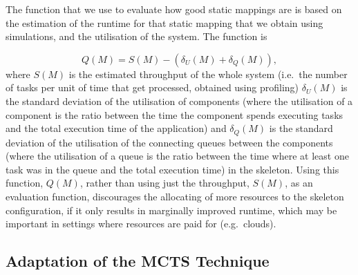 \documentclass[smallextended]{svjour3}
\begin{document}


The function that we use to evaluate how good static
mappings are is based on the estimation of the runtime for that static
mapping that we obtain using simulations, and the utilisation of the
system. The function is


$$Q(M) = S(M) - (\delta_U(M) + \delta_Q(M)),$$
where $S(M)$ is the estimated throughput of the whole system (i.e.\
the number of tasks per unit of time that get processed, obtained using profiling)
$\delta_U(M)$ is the standard deviation of the utilisation of
components (where the utilisation of a component is the ratio between the time the component spends
executing tasks and the total execution time of the application) and $\delta_Q(M)$ is the standard deviation of
the utilisation of the connecting queues between the components (where
the utilisation of a queue is the ratio between the time where at least
one task was in the queue and the total execution time) in the skeleton. Using this function, $Q(M)$, rather than using
just the throughput, $S(M)$, as an evaluation function, discourages the allocating of more resources to the skeleton configuration, if
it only results in marginally improved runtime, which may be important
in settings where resources are paid for (e.g.\ clouds).

\subsection{Adaptation of the MCTS Technique}
\end{document}
